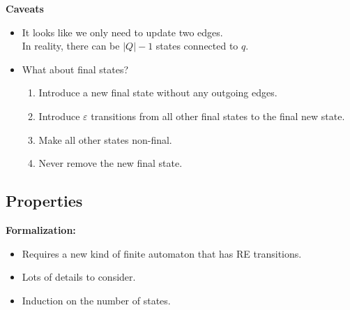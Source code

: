 \documentclass{beamer}
\begin{document}
\begin{frame}
\begin{itemize}
\begin{figure}
            \end{figure}


    \end{itemize}
\end{frame}

\begin{frame}
    \textbf{Caveats} \\
    \begin{itemize}
        \item
            It looks like we only need to update two edges. \\
            In reality, there can be $|Q|-1$ states connected to $q$.
        \item
            What about final states?\\
            \pause
            \begin{enumerate}
                \item
                    Introduce a new final state without any outgoing edges.
                \item
                    Introduce $\varepsilon$ transitions from all other final states to the final new state.
                \item
                    Make all other states non-final.
                \item
                    Never remove the new final state.
            \end{enumerate}
    \end{itemize}
\end{frame}

\subsection*{Properties}
\begin{frame}
    \textbf{Formalization:} \\
    \begin{itemize}
        \item
            Requires a new kind of finite automaton that has RE transitions.
        \item
            Lots of details to consider.
        \item
            Induction on the number of states.
    \end{itemize}
\end{frame}
\end{document}

